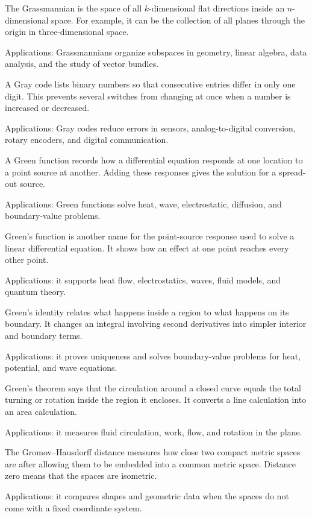The Grassmannian is the space of all $k$-dimensional flat directions inside an $n$-dimensional space. For example, it can be the collection of all planes through the origin in three-dimensional space. \par\noindent Applications: Grassmannians organize subspaces in geometry, linear algebra, data analysis, and the study of vector bundles.

A Gray code lists binary numbers so that consecutive entries differ in only one digit. This prevents several switches from changing at once when a number is increased or decreased. \par\noindent Applications: Gray codes reduce errors in sensors, analog-to-digital conversion, rotary encoders, and digital communication.

A Green function records how a differential equation responds at one location to a point source at another. Adding these responses gives the solution for a spread-out source. \par\noindent Applications: Green functions solve heat, wave, electrostatic, diffusion, and boundary-value problems.

Green's function is another name for the point-source response used to solve a linear differential equation. It shows how an effect at one point reaches every other point. \par\noindent Applications: it supports heat flow, electrostatics, waves, fluid models, and quantum theory.

Green's identity relates what happens inside a region to what happens on its boundary. It changes an integral involving second derivatives into simpler interior and boundary terms. \par\noindent Applications: it proves uniqueness and solves boundary-value problems for heat, potential, and wave equations.

Green's theorem says that the circulation around a closed curve equals the total turning or rotation inside the region it encloses. It converts a line calculation into an area calculation. \par\noindent Applications: it measures fluid circulation, work, flow, and rotation in the plane.

The Gromov--Hausdorff distance measures how close two compact metric spaces are after allowing them to be embedded into a common metric space. Distance zero means that the spaces are isometric. \par\noindent Applications: it compares shapes and geometric data when the spaces do not come with a fixed coordinate system.

